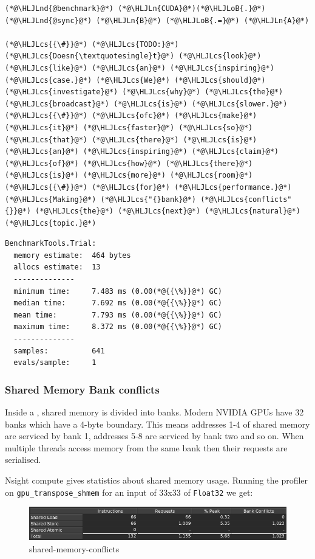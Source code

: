 \documentclass[12pt,a4paper]{article}
\newcommand{\HLJLn}[1]{#1}
\newcommand{\HLJLnd}[1]{\textcolor[RGB]{214,102,97}{#1}}
\newcommand{\HLJLoB}[1]{\textcolor[RGB]{102,102,102}{\textbf{#1}}}
\newcommand{\HLJLcs}[1]{\textcolor[RGB]{153,153,119}{\textit{#1}}}
\begin{document}
\begin{lstlisting}
(*@\HLJLnd{@benchmark}@*) (*@\HLJLn{CUDA}@*)(*@\HLJLoB{.}@*)(*@\HLJLnd{@sync}@*) (*@\HLJLn{B}@*) (*@\HLJLoB{.=}@*) (*@\HLJLn{A}@*)

(*@\HLJLcs{{\#}}@*) (*@\HLJLcs{TODO:}@*) (*@\HLJLcs{Doesn{\textquotesingle}t}@*) (*@\HLJLcs{look}@*) (*@\HLJLcs{like}@*) (*@\HLJLcs{an}@*) (*@\HLJLcs{inspiring}@*) (*@\HLJLcs{case.}@*) (*@\HLJLcs{We}@*) (*@\HLJLcs{should}@*) (*@\HLJLcs{investigate}@*) (*@\HLJLcs{why}@*) (*@\HLJLcs{the}@*) (*@\HLJLcs{broadcast}@*) (*@\HLJLcs{is}@*) (*@\HLJLcs{slower.}@*)
(*@\HLJLcs{{\#}}@*) (*@\HLJLcs{ofc}@*) (*@\HLJLcs{make}@*) (*@\HLJLcs{it}@*) (*@\HLJLcs{faster}@*) (*@\HLJLcs{so}@*) (*@\HLJLcs{that}@*) (*@\HLJLcs{there}@*) (*@\HLJLcs{is}@*) (*@\HLJLcs{an}@*) (*@\HLJLcs{inspiring}@*) (*@\HLJLcs{claim}@*) (*@\HLJLcs{of}@*) (*@\HLJLcs{how}@*) (*@\HLJLcs{there}@*) (*@\HLJLcs{is}@*) (*@\HLJLcs{more}@*) (*@\HLJLcs{room}@*) 
(*@\HLJLcs{{\#}}@*) (*@\HLJLcs{for}@*) (*@\HLJLcs{performance.}@*) (*@\HLJLcs{Making}@*) (*@\HLJLcs{"{}bank}@*) (*@\HLJLcs{conflicts"{}}@*) (*@\HLJLcs{the}@*) (*@\HLJLcs{next}@*) (*@\HLJLcs{natural}@*) (*@\HLJLcs{topic.}@*)
\end{lstlisting}

\begin{lstlisting}
BenchmarkTools.Trial: 
  memory estimate:  464 bytes
  allocs estimate:  13
  --------------
  minimum time:     7.483 ms (0.00(*@{{\%}}@*) GC)
  median time:      7.692 ms (0.00(*@{{\%}}@*) GC)
  mean time:        7.793 ms (0.00(*@{{\%}}@*) GC)
  maximum time:     8.372 ms (0.00(*@{{\%}}@*) GC)
  --------------
  samples:          641
  evals/sample:     1
\end{lstlisting}


\subsubsection{Shared Memory Bank conflicts}
Inside a , shared memory is divided into banks. Modern NVIDIA GPUs have 32 banks which have a 4-byte boundary. This means addresses 1-4 of shared memory are serviced by bank 1, addresses 5-8 are serviced by bank two and so on. When multiple threads access memory from the same bank then their requests are serialised.

Nsight compute gives statistics about shared memory usage. Running the profiler on \texttt{gpu\_transpose\_shmem} for an input of 33x33 of \texttt{Float32} we get:

\begin{figure}
\centering
\includegraphics{./assets/shmem-conflicts.png}
\caption{shared-memory-conflicts}
\end{figure}
\end{document}
